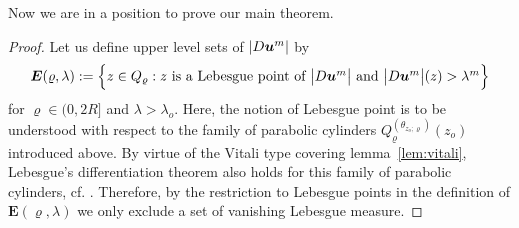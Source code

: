 \documentclass[a4paper, 10pt, american]{amsart}
\numberwithin{theorem}{section}
\numberwithin{equation}{section}
\renewcommand{\rho}{\varrho}
\newcommand{\power}[2]{\bm{#1^{\mbox{\unboldmath{\scriptsize$#2$}}}}}
\begin{document}
Now we are in a position to prove our main theorem.

\begin{proof}
Let us define upper level sets of $|D\power{u}{m}|$ by 
$$
	\boldsymbol E(\rho,\lambda)
	:=
	\Big\{z\in Q_{\rho}: 
	\mbox{$z$ is a Lebesgue point of $\big|D\power{u}{m}\big|$ and 
	$\big|D\power{u}{m}\big|(z) > \lambda^{m}$}\Big\}
$$
for $\rho\in(0,2R]$ and $\lambda>\lambda_o$.
Here, the notion of Lebesgue point is to be understood with respect to
the family of parabolic cylinders
$Q_{\rho}^{(\theta_{z_o;\rho})}(z_o)$ introduced above.
By virtue of the Vitali type covering lemma~\ref{lem:vitali}, 
Lebesgue's differentiation theorem also holds for this family of
parabolic cylinders, cf. \cite[2.9.1]{Federer}. Therefore, by the restriction to
Lebesgue points in the definition of $\boldsymbol E(\rho,\lambda)$
we only exclude a set of vanishing Lebesgue measure.


\end{proof}
\end{document}
